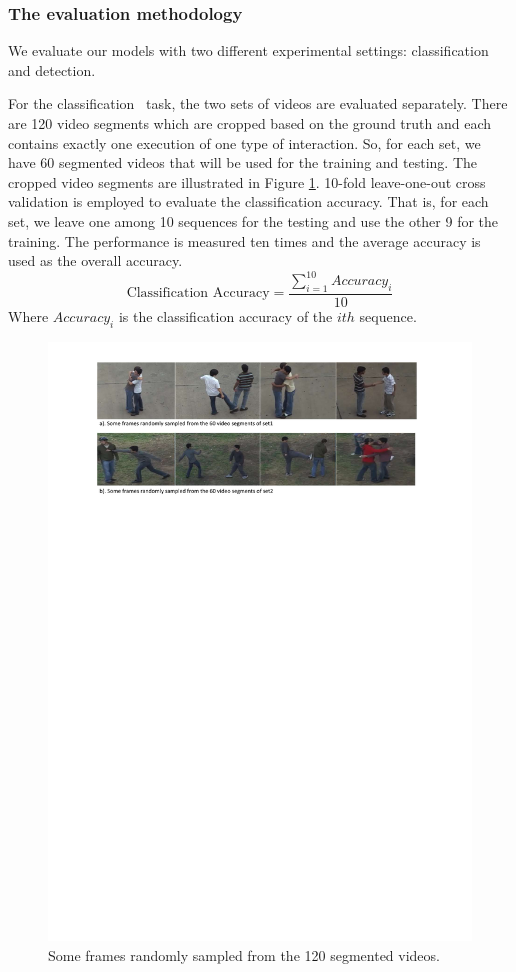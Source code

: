 \subsubsection*{The evaluation methodology}
We evaluate our models with two different experimental settings: classification and detection. 
\par 
For the \textquotesingle classification \textquotesingle \ task, the two sets of videos are evaluated separately. There are 120 video segments which are cropped based on the ground truth and each contains exactly one execution of one type of interaction. So, for each set, we have 60 segmented videos that will be used for the training and testing. The cropped video segments are illustrated in Figure \ref{fig:ut_segments}.  10-fold leave-one-out cross validation is employed to evaluate the classification accuracy. That is, for each set, we leave one among 10 sequences for the testing and use the other 9 for the training. The performance is measured ten times and the average accuracy is used as the overall accuracy. 
\begin{equation*}
\text{Classification Accuracy} = \frac{\sum_{i=1}^{10} Accuracy_i }{10}
\end{equation*}
Where \(Accuracy_i\) is the classification accuracy of the \(ith\) sequence.
\begin{figure}
	\includegraphics[trim=2cm 22cm 0cm 1cm]{figs/ut_segments.pdf}
	\caption{Some frames randomly sampled from the 120 segmented videos. }
	\label{fig:ut_segments}
\end{figure}
